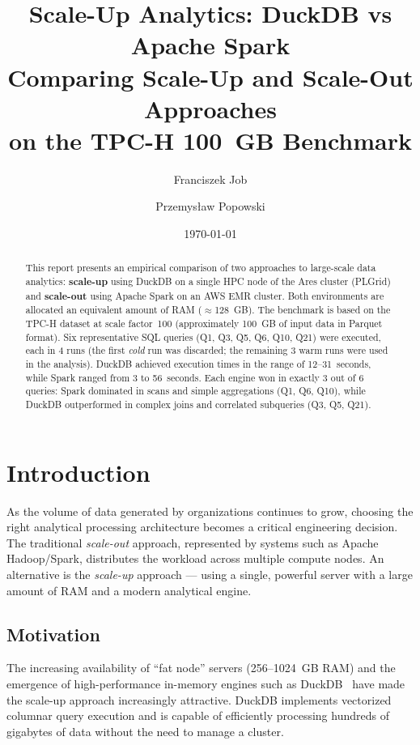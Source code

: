 \documentclass[12pt,a4paper]{article}
\title{
  \textbf{Scale-Up Analytics: DuckDB vs Apache Spark} \\
  \large Comparing Scale-Up and Scale-Out Approaches \\
  on the TPC-H 100~GB Benchmark
}
\author{Franciszek Job \and Przemys\l{}aw Popowski}
\date{\today}
\begin{document}
\maketitle

\begin{abstract}
This report presents an empirical comparison of two approaches to large-scale data
analytics: \textbf{scale-up} using DuckDB on a single HPC node of the Ares cluster
(PLGrid) and \textbf{scale-out} using Apache Spark on an AWS EMR cluster. Both
environments are allocated an equivalent amount of RAM ($\approx$128~GB). The benchmark
is based on the TPC-H dataset at scale factor~100 (approximately 100~GB of input data
in Parquet format). Six representative SQL queries (Q1, Q3, Q5, Q6, Q10, Q21) were
executed, each in 4 runs (the first \textit{cold} run was discarded; the remaining
3 warm runs were used in the analysis). DuckDB achieved execution times in the range
of 12--31~seconds, while Spark ranged from 3 to 56~seconds. Each engine won in exactly
3 out of 6 queries: Spark dominated in scans and simple aggregations (Q1, Q6, Q10),
while DuckDB outperformed in complex joins and correlated subqueries (Q3, Q5, Q21).
\end{abstract}

\tableofcontents
\newpage

\section{Introduction}

As the volume of data generated by organizations continues to grow, choosing the right
analytical processing architecture becomes a critical engineering decision. The
traditional \textit{scale-out} approach, represented by systems such as Apache
Hadoop/Spark, distributes the workload across multiple compute nodes. An alternative
is the \textit{scale-up} approach --- using a single, powerful server with a large
amount of RAM and a modern analytical engine.

\subsection{Motivation}

The increasing availability of ``fat node'' servers (256--1024~GB RAM) and the
emergence of high-performance in-memory engines such as DuckDB~\cite{duckdb2019} have
made the scale-up approach increasingly attractive. DuckDB implements vectorized
columnar query execution and is capable of efficiently processing hundreds of
gigabytes of data without the need to manage a cluster.
\end{document}
